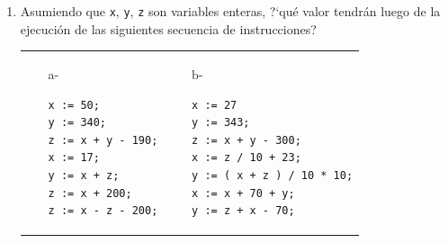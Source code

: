 \documentclass[a4paper,10pt]{article}
\begin{document}
\begin{enumerate}
\item Asumiendo que \verb=x=, \verb=y=, \verb=z= son variables enteras, ?`qu\'e valor tendr\'an luego de la ejecuci\'on de las siguientes secuencia de instrucciones?\\
\begin{tabular}{p{} p{}}
    \begin{itemize}
        \item[a-] 
\begin{verbatim} 
x := 50;
y := 340;
z := x + y - 190;
x := 17;
y := x + z;
z := x + 200;
z := x - z - 200;
\end{verbatim}
    \end{itemize}
&
    \begin{itemize}
        \item[b-] 
\begin{verbatim}
x := 27
y := 343;
z := x + y - 300;
x := z / 10 + 23;
y := ( x + z ) / 10 * 10;
x := x + 70 + y;
y := z + x - 70;
\end{verbatim}
    \end{itemize}
\\
\end{tabular}


\end{enumerate}
\end{document}
